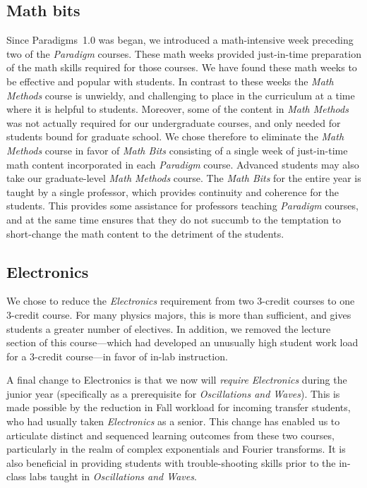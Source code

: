 \documentclass[english,aps,pra,reprint,noshowpacs,superscriptaddress]{revtex4-1}
\begin{document}
\subsection{Math bits}
Since Paradigms~1.0 was began, we introduced a
math-intensive week preceding two of the \emph{Paradigm} courses.  These math weeks provided
just-in-time preparation of the math skills required for those courses.
We have found these math weeks to be effective and popular with students.  In contrast to
these weeks the \emph{Math Methods} course is unwieldy, and challenging to place in
the curriculum at a time where it is helpful to students.  Moreover, some of the content
in \emph{Math Methods} was not actually required for our undergraduate courses, and only
needed for students bound for graduate school.  We chose therefore to eliminate the \emph{Math Methods} course in favor of \emph{Math Bits} consisting of a single week of 
just-in-time math content incorporated in each \emph{Paradigm} course.  Advanced
students may also take our graduate-level \emph{Math Methods} course.  
The \emph{Math Bits} for the entire year is taught by a single professor,
which provides continuity and coherence for the students.  
This provides some assistance for
professors teaching \emph{Paradigm} courses, and at the same time ensures
that they do not succumb to the temptation to short-change the math content
to the detriment of the students.

\subsection{Electronics}
We chose to reduce the \emph{Electronics} requirement from two 3-credit
courses to one 3-credit course.  For many physics majors, this is more
than sufficient, and gives students a greater number of electives.  In
addition, we removed the lecture section of this course---which had
developed an unusually high student work load for a 3-credit
course---in favor of in-lab instruction.

A final change to Electronics is that we now will \emph{require}
\emph{Electronics} during the junior year (specifically as a prerequisite for
\emph{Oscillations and Waves}).  This is made possible by the reduction in
Fall workload for incoming transfer students, who had
usually taken \emph{Electronics} as a senior.  This change has enabled us to
articulate distinct and sequenced learning outcomes from these two
courses, particularly in the realm of complex exponentials and Fourier
transforms.  It is also beneficial in providing students with
trouble-shooting skills prior to the in-class labs taught in
\emph{Oscillations and Waves}.
\end{document}
